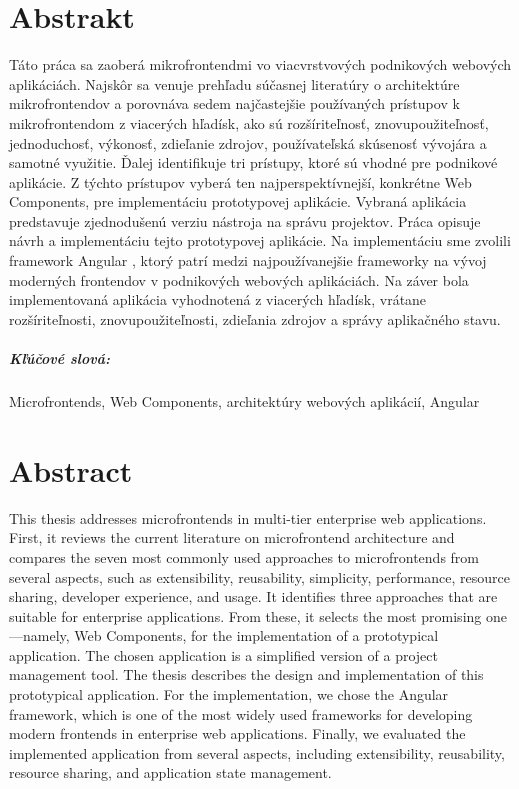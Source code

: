 \documentclass[12pt, oneside]{book}  %
\begin{document}
\vfill\eject 

\newpage 
\thispagestyle{empty}
\chapter*{Abstrakt}\label{chap:abstract_sk}
Táto práca sa zaoberá mikrofrontendmi vo viacvrstvových podnikových webových aplikáciách. Najskôr sa venuje prehľadu súčasnej literatúry o architektúre mikrofrontendov a porovnáva sedem najčastejšie používaných prístupov k mikrofrontendom z viacerých hľadísk, ako sú rozšíriteľnosť, znovupoužiteľnosť, jednoduchosť, výkonosť, zdieľanie zdrojov, používateľská skúsenosť vývojára a samotné využitie. Ďalej identifikuje tri prístupy, ktoré sú vhodné pre podnikové aplikácie. Z týchto prístupov vyberá ten najperspektívnejší, konkrétne Web Components, pre implementáciu prototypovej aplikácie. Vybraná aplikácia predstavuje zjednodušenú verziu nástroja na správu projektov. Práca opisuje návrh a implementáciu tejto prototypovej aplikácie. Na implementáciu sme zvolili framework Angular \cite{Angular}, ktorý patrí medzi najpoužívanejšie frameworky na vývoj moderných frontendov v podnikových webových aplikáciách. Na záver bola implementovaná aplikácia vyhodnotená z viacerých hľadísk, vrátane rozšíriteľnosti, znovupoužiteľnosti, zdieľania zdrojov a správy aplikačného stavu.

\paragraph*{Kľúčové slová:} Microfrontends, Web Components, architektúry webových aplikácií, Angular


\newpage 
\thispagestyle{empty}
\chapter*{Abstract}\label{chap:abstract_en}
This thesis addresses microfrontends in multi-tier enterprise web applications. First, it reviews the current literature on microfrontend architecture and compares the seven most commonly used approaches to microfrontends from several aspects, such as extensibility, reusability, simplicity, performance, resource sharing, developer experience, and usage. It identifies three approaches that are suitable for enterprise applications. From these, it selects the most promising one—namely, Web Components, for the implementation of a prototypical application. The chosen application is a simplified version of a project management tool. The thesis describes the design and implementation of this prototypical application. For the implementation, we chose the Angular \cite{Angular} framework, which is one of the most widely used frameworks for developing modern frontends in enterprise web applications. Finally, we evaluated the implemented application from several aspects, including extensibility, reusability, resource sharing, and application state management.
\end{document}
